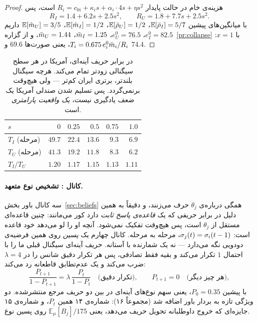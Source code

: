 \documentclass[12pt,a4paper]{article}
\begin{document}
\begin{proof}
هزینه‌ی خام در حالت پایدار
$R_i=c_{0i}+\kappa_i s+\alpha_i\cdot4s+\eta s^2$ است، پس
\[
  R_I = 1.4+6.2s+2.5s^2,\qquad R_U = 1.8+7.7s+2.5s^2 .
\]
با میانگین‌های پیشین $\mathbb{E}[\bar{\rho}_I]=5/7$، $\mathbb{E}[\bar{\rho}_U]=1/2$،
$\mathbb{E}[\hat{m}_I]=1/2$، $\mathbb{E}[\hat{m}_U]=3/5$ داریم $e_I^0=82.5$،
$e_U^0=76.5$، $\bar{m}_I=1.25$، $\bar{m}_U=1.44$، و از گزاره~\ref{pr:collapse}
با $x=1$: $T_i=0.675\,e_i^0\bar{m}_i/R_i$، یعنی صورت‌ها $69.6$ و $74.4$.
\end{proof}

\begin{table}[h]\centering\small
\begin{tabular}{lrrrrr}
\toprule
$s$ & $0$ & $0.25$ & $0.5$ & $0.75$ & $1.0$\\
\midrule
$T_I$ (مرحله) & $49.7$ & $22.4$ & $13.6$ & $9.3$ & $6.9$\\
$T_U$ (مرحله) & $41.3$ & $19.2$ & $11.8$ & $8.3$ & $6.2$\\
$T_I/T_U$     & $1.20$ & $1.17$ & $1.15$ & $1.13$ & $1.11$\\
\bottomrule
\end{tabular}
\caption{در برابر حریف آینه‌ای، آمریکا در هر سطح سیگنالی زودتر تمام می‌کند.
هرچه سیگنال بلندتر، برتری ایران کم‌تر — ولی هیچ‌وقت برنمی‌گردد. پس تسلیم
شدن صندلی آمریکا یک ضعف یادگیری نیست، \emph{یک واقعیت پارامتری} است.}
\end{table}

\paragraph{کانال : تشخیص نوع متعهد.}
سه کانال باور بخش~\ref{sec:beliefs} همگی درباره‌ی $\theta_j$ حرف می‌زنند، و
دقیقاً به همین دلیل در برابر حریفی که یک \emph{قاعده‌ی پاسخ ثابت} دارد کور
می‌مانند: چنین قاعده‌ای مستقل از $\theta_j$ است، پس هیچ‌وقت تفکیک نمی‌شود.
آنچه او را لو می‌دهد خود قاعده است: $\sigma_j(t)=\sigma_i(t-1)$، مرحله به
مرحله. کانال چهارم یک \emph{پسین} روی همین فرضیه‌ی دودویی نگه می‌دارد — نه
یک شمارنده با آستانه. حریف آینه‌ای سیگنال قبلی ما را با احتمال $1$ تکرار
می‌کند و بقیه فقط تصادفی، پس هر تکرار دقیق شانس را در $\lambda=4$ ضرب
می‌کند و یک عدم‌تطابق قاطعانه رد می‌کند:
\[
  \frac{P_{t+1}}{1-P_{t+1}}=\lambda\,\frac{P_t}{1-P_t}\quad
  \text{(تکرار دقیق)},\qquad P_{t+1}=0\quad\text{(هر چیز دیگر)},
\]
با پیشین $P_0=0.35$، یعنی سهم نوع‌های آینه‌ای در بین دو حریف مرجع منتشرشده.
دو ویژگی تازه به بردار باور اضافه شد (مجموعاً ۱۶): شماره‌ی ۱۴ همین
$P_t$، و شماره‌ی ۱۵ جایزه‌ای که خروج داوطلبانه تحویل حریف می‌دهد، یعنی
$\mathbb{E}_\mu[B_j]/175$ روی پسین نوع.
\end{document}
